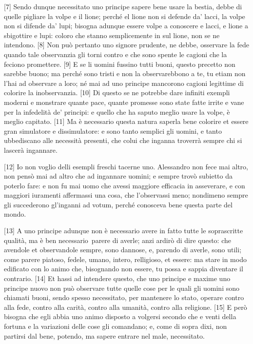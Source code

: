{[}7{]} Sendo dunque necessitato uno principe sapere bene usare la
bestia, debbe di quelle pigliare la volpe e il lione; perché el lione
non si defende da' lacci, la volpe non si difende da' lupi; bisogna
adunque essere volpe a conoscere e lacci, e lione a sbigottire e lupi:
coloro che stanno semplicemente in sul lione, non se ne intendono.
{[}8{]} Non può pertanto uno signore prudente, ne debbe, osservare la
fede quando tale observanzia gli torni contro e che sono spente le
cagioni che la feciono promettere. {[}9{]} E se li uomini fussino tutti
buoni, questo precetto non sarebbe buono; ma perché sono tristi e non la
observarebbono a te, tu etiam non l'hai ad observare a loro; né mai ad
uno principe mancorono cagioni legittime di colorire la inobservanzia.
{[}10{]} Di questo se ne potrebbe dare infiniti exempli moderni e
monstrare quante pace, quante promesse sono state fatte irrite e vane
per la infedelità de' principi: e quello che ha saputo meglio usare la
volpe, è meglio capitato. {[}11{]} Ma è necessario questa natura saperla
bene colorire et essere gran simulatore e dissimulatore: e sono tanto
semplici gli uomini, e tanto ubbediscano alle necessità presenti, che
colui che inganna troverrà sempre chi si lascerà ingannare.

{[}12{]} Io non voglio delli esempli freschi tacerne uno. Alessandro 
non fece mai altro, non pensò mai ad altro che ad ingannare uomini; e
sempre trovò subietto da poterlo fare: e non fu mai uomo che avessi
maggiore efficacia in asseverare, e con maggiori iuramenti affermassi
una cosa, che l'observassi meno; nondimeno sempre gli succederono
gl'inganni ad votum, perché conosceva bene questa parte del mondo.

{[}13{]} A uno principe adunque non è necessario avere in fatto tutte le
soprascritte qualità, ma è ben necessario\est\ parere di averle; anzi ardirò
di dire questo: che avendole et observandole sempre, sono dannose, e,
parendo di averle, sono utili; come parere piatoso, fedele, umano,
intero, relligioso, et essere: ma stare in modo edificato con lo animo
che, bisognando non essere, tu possa e sappia diventare il contrario.
{[}14{]} Et hassi ad intendere questo, che uno principe e maxime uno
principe nuovo non può observare tutte quelle cose per le quali gli
uomini sono chiamati buoni, sendo spesso necessitato, per mantenere lo
stato, operare contro alla fede, contro alla carità, contro alla
umanità, contro alla religione. {[}15{]} E però bisogna che egli abbia
uno animo disposto a volgersi secondo che e venti della fortuna e la
variazioni delle cose gli comandano; e, come di sopra dixi, non partirsi
dal bene, potendo, ma sapere entrare nel male, necessitato.

